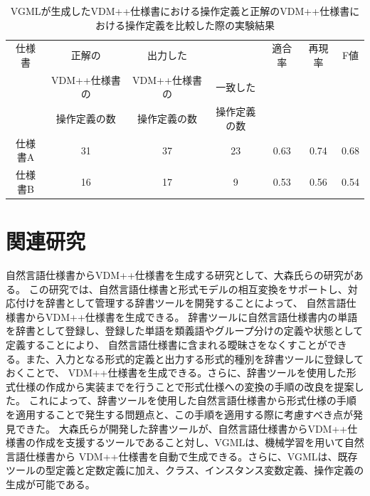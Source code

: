 \begin{table}[t]
	\caption{VGMLが生成したVDM++仕様書における操作定義と正解のVDM++仕様書における操作定義を比較した際の実験結果}
	\label{table:operateResult}
	\begin{center}
        \begin{tabular}{c|c|c|c|c|c|c}
            \hline
            仕様書  & 正解の & 出力した &  & 適合率 & 再現率 & F値  \\
                    & VDM++仕様書の & VDM++仕様書の & 一致した  &        &       &      \\
                    & 操作定義の数 & 操作定義の数 & 操作定義の数  &        &       &      \\
            \hline
            仕様書A & 31                             & 37                 & 23                  & 0.63   & 0.74    & 0.68  \\
            \hline
            仕様書B & 16                             & 17                  & 9                  & 0.53   & 0.56   & 0.54 \\
            \hline
        \end{tabular}
    \end{center}
\end{table}

\section{関連研究}
自然言語仕様書からVDM++仕様書を生成する研究として、大森氏らの研究\cite{research1,research2}がある。
この研究では、自然言語仕様書と形式モデルの相互変換をサポートし、対応付けを辞書として管理する辞書ツールを開発することによって、
自然言語仕様書からVDM++仕様書を生成できる\cite{research1}。
辞書ツールに自然言語仕様書内の単語を辞書として登録し、登録した単語を類義語やグループ分けの定義や状態として定義することにより、
自然言語仕様書に含まれる曖昧さをなくすことができる。また、入力となる形式的定義と出力する形式的種別を辞書ツールに登録しておくことで、
VDM++仕様書を生成できる。さらに、辞書ツールを使用した形式仕様の作成から実装までを行うことで形式仕様への変換の手順の改良を提案した\cite{research2}。
これによって、辞書ツールを使用した自然言語仕様書から形式仕様の手順を適用することで発生する問題点と、この手順を適用する際に考慮すべき点が発見できた。
大森氏らが開発した辞書ツールが、自然言語仕様書からVDM++仕様書の作成を支援するツールであること対し、VGMLは、機械学習を用いて自然言語仕様書から
VDM++仕様書を自動で生成できる。さらに、VGMLは、既存ツールの型定義と定数定義に加え、クラス、インスタンス変数定義、操作定義の生成が可能である。

